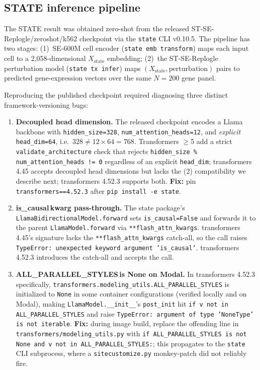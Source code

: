 \documentclass{article}
\theoremstyle{plain}
\theoremstyle{definition}
\theoremstyle{remark}
\begin{document}
\subsection{STATE inference pipeline}
\label{app:state_methods}

The STATE result was obtained zero-shot from the released ST-SE-Replogle/zeroshot/k562 checkpoint via the \texttt{state} CLI v0.10.5. The pipeline has two stages: (1)~SE-600M cell encoder (\texttt{state emb transform}) maps each input cell to a 2{,}058-dimensional $X_{\mathrm{state}}$ embedding; (2)~the ST-SE-Replogle perturbation model (\texttt{state tx infer}) maps $(X_{\mathrm{state}}, \mathrm{perturbation})$ pairs to predicted gene-expression vectors over the same $N{=}200$ gene panel.

Reproducing the published checkpoint required diagnosing three distinct framework-versioning bugs:
\begin{enumerate}[leftmargin=1.5em,topsep=2pt,itemsep=2pt]
    \item \textbf{Decoupled head dimension.} The released checkpoint encodes a Llama backbone with \texttt{hidden\_size=328}, \texttt{num\_attention\_heads=12}, and \emph{explicit} \texttt{head\_dim=64}, i.e.\ $328 \neq 12 \times 64 = 768$. Transformers $\geq$5 add a strict \texttt{validate\_architecture} check that rejects \texttt{hidden\_size \% num\_attention\_heads != 0} regardless of an explicit \texttt{head\_dim}; transformers 4.45 accepts decoupled head dimensions but lacks the (2) compatibility we describe next; transformers 4.52.3 supports both. \textbf{Fix:} pin \texttt{transformers==4.52.3} after \texttt{pip install -e state}.
    \item \textbf{is\_causal\,kwarg pass-through.} The state package's \texttt{LlamaBidirectionalModel.forward} sets \texttt{is\_causal=False} and forwards it to the parent \texttt{LlamaModel.forward} via \texttt{**flash\_attn\_kwargs}. transformers 4.45's signature lacks the \texttt{**flash\_attn\_kwargs} catch-all, so the call raises \texttt{TypeError: unexpected keyword argument 'is\_causal'}. transformers 4.52.3 introduces the catch-all and accepts the call.
    \item \textbf{ALL\_PARALLEL\_STYLES\,is None on Modal.} In transformers 4.52.3 specifically, \texttt{transformers.modeling\_utils.ALL\_PARALLEL\_STYLES} is initialized to \texttt{None} in some container configurations (verified locally and on Modal), making \texttt{LlamaModel.\_\_init\_\_}'s \texttt{post\_init} hit \texttt{if v not in ALL\_PARALLEL\_STYLES} and raise \texttt{TypeError: argument of type 'NoneType' is not iterable}. \textbf{Fix:} during image build, replace the offending line in \texttt{transformers/modeling\_utils.py} with \texttt{if ALL\_PARALLEL\_STYLES is not None and v not in ALL\_PARALLEL\_STYLES:}; this propagates to the \texttt{state} CLI subprocess, where a \texttt{sitecustomize.py} monkey-patch did not reliably fire.
\end{enumerate}
\end{document}
